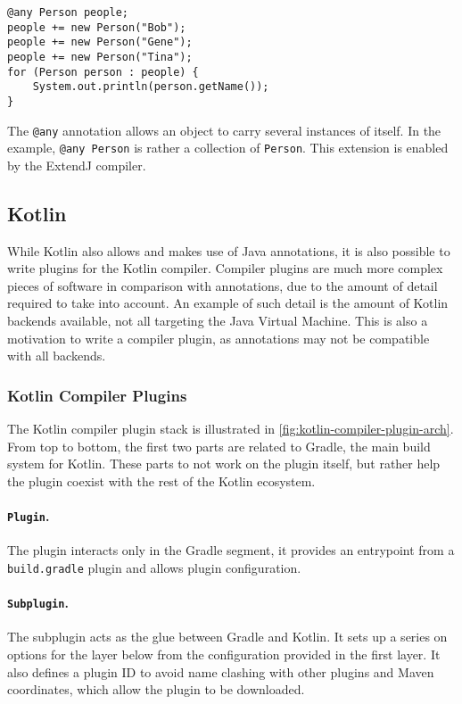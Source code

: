 \begin{listing}
    \centering
    \begin{verbatim}
@any Person people;
people += new Person("Bob");
people += new Person("Gene");
people += new Person("Tina");
for (Person person : people) {
    System.out.println(person.getName());
}
    \end{verbatim}
    \caption{
        The \texttt{@any} annotation allows an object to carry several instances of itself.
        In the example, \texttt{@any Person} is rather a collection of \texttt{Person}.
        This extension is enabled by the ExtendJ compiler.
    }
    \label{lst:java-annotation-declaration}
\end{listing}

\subsection{Kotlin}\label{sec:lang-preprocessors:kotlin}

While Kotlin also allows and makes use of Java annotations, it is also possible to write plugins for the Kotlin compiler.
Compiler plugins are much more complex pieces of software in comparison with annotations,
due to the amount of detail required to take into account.
An example of such detail is the amount of Kotlin backends available, not all targeting the Java Virtual Machine.
This is also a motivation to write a compiler plugin, as annotations may not be compatible with all backends.

\subsubsection*{Kotlin Compiler Plugins}\label{sec:lang-preprocessors:kotlin:annotation}
The Kotlin compiler plugin stack is illustrated in \autoref{fig:kotlin-compiler-plugin-arch}.
From top to bottom, the first two parts are related to Gradle, the main build system for Kotlin.
These parts to not work on the plugin itself, but rather help the plugin coexist with the rest of the Kotlin ecosystem.

\paragraph{\texttt{Plugin}.}
The plugin interacts only in the Gradle segment,
it provides an entrypoint from a \texttt{build.gradle} plugin and allows plugin configuration.

\paragraph{\texttt{Subplugin}.}
The subplugin acts as the glue between Gradle and Kotlin.
It sets up a series on options for the layer below from the configuration provided in the first layer.
It also defines a plugin ID to avoid name clashing with other plugins and Maven coordinates, which allow the plugin to be downloaded.

